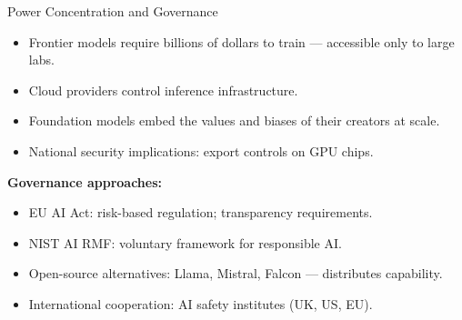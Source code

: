 \documentclass[aspectratio=169,10pt]{beamer}
\begin{document}
\begin{frame}{Power Concentration and Governance}
  \begin{tcolorbox}[alertbox, title=Concentration Risks]
    \begin{itemize}
      \item Frontier models require billions of dollars to train — accessible only to large labs.
      \item Cloud providers control inference infrastructure.
      \item Foundation models embed the values and biases of their creators at scale.
      \item National security implications: export controls on GPU chips.
    \end{itemize}
  \end{tcolorbox}
  \vspace{0.3em}
  \textbf{Governance approaches:}
  \begin{itemize}
    \item EU AI Act: risk-based regulation; transparency requirements.
    \item NIST AI RMF: voluntary framework for responsible AI.
    \item Open-source alternatives: Llama, Mistral, Falcon — distributes capability.
    \item International cooperation: AI safety institutes (UK, US, EU).
  \end{itemize}
\end{frame}
\end{document}
